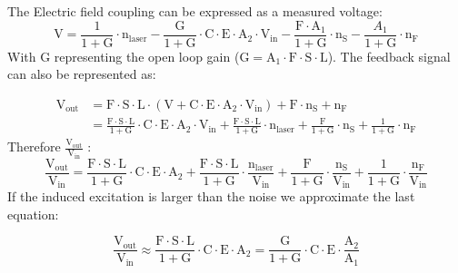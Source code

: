 The Electric field coupling can be expressed as a measured voltage:
$$\mathrm{V} = \frac{1}{1 + \mathrm{G}} \cdot \mathrm{n}_\mathrm{laser} - \frac{\mathrm{G}}{1 + \mathrm{G}} \cdot \mathrm{C}  \cdot \mathrm{E} \cdot \mathrm{A}_{2} \cdot \mathrm{V}_\mathrm{in} - \frac{\mathrm{F} \cdot \mathrm{A}_1}{1 + \mathrm{G}} \cdot \mathrm{n}_\mathrm{S} - \frac{A_1}{1 + \mathrm{G}} \cdot \mathrm{n}_\mathrm{F}$$
With G representing the open loop gain ($\mathrm{G} = \mathrm{A}_1 \cdot \mathrm{F} \cdot \mathrm{S} \cdot \mathrm{L}$). The feedback signal can also be represented as:

	\begin{align*} \mathrm{V}_\mathrm{out} & = \mathrm{F} \cdot \mathrm{S} \cdot \mathrm{L} \cdot (\mathrm{V} + \mathrm{C} \cdot \mathrm{E} \cdot \mathrm{A}_{2} \cdot \mathrm{V}_\mathrm{in}) + \mathrm{F} \cdot \mathrm{n}_\mathrm{S} + \mathrm{n}_\mathrm{F} \\ & = \frac{\mathrm{F} \cdot \mathrm{S} \cdot \mathrm{L}}{ 1 + \mathrm{G}} \cdot \mathrm{C} \cdot \mathrm{E} \cdot \mathrm{A}_{2} \cdot \mathrm{V}_\mathrm{in} + \frac{\mathrm{F} \cdot \mathrm{S} \cdot \mathrm{L}}{ 1 + \mathrm{G}} \cdot \mathrm{n}_\mathrm{laser} + \frac{\mathrm{F} }{ 1 + \mathrm{G}}\cdot \mathrm{n}_\mathrm{S} +  \frac{1}{ 1 + \mathrm{G}} \cdot \mathrm{n}_\mathrm{F} \end{align*}
Therefore $\frac{\mathrm{V}_\mathrm{out}}{\mathrm{V}_\mathrm{in}}$ : 
$$ \frac{\mathrm{V}_\mathrm{out}}{\mathrm{V}_\mathrm{in}} = \frac{\mathrm{F} \cdot \mathrm{S} \cdot \mathrm{L}}{1 + \mathrm{G}} \cdot \mathrm{C} \cdot \mathrm{E} \cdot \mathrm{A}_{2}  + \frac{\mathrm{F} \cdot \mathrm{S} \cdot \mathrm{L}}{ 1 + \mathrm{G}} \cdot \frac{\mathrm{n}_\mathrm{laser}}{\mathrm{V}_\mathrm{in}}+ \frac{\mathrm{F} }{ 1 + \mathrm{G}} \cdot \frac{\mathrm{n}_\mathrm{S}}{\mathrm{V}_\mathrm{in}} +  \frac{1}{ 1 + \mathrm{G}} \cdot \frac{\mathrm{n}_\mathrm{F}}{\mathrm{V}_\mathrm{in}}$$
If the induced excitation is larger than the noise  we approximate the last equation:

$$ \frac{\mathrm{V}_\mathrm{out}}{\mathrm{V_{in}}} \approx \frac{\mathrm{F} \cdot \mathrm{S} \cdot \mathrm{L}}{1 + \mathrm{G}} \cdot \mathrm{C} \cdot \mathrm{E} \cdot \mathrm{A}_{2} = \frac{\mathrm{G}}{1 + \mathrm{G}} \cdot \mathrm{C} \cdot \mathrm{E} \cdot \frac{\mathrm{A}_{2}}{\mathrm{A}_{1}} $$

